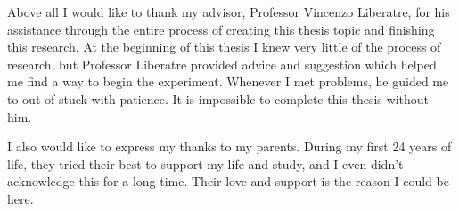 \begin{sloppypar}
Above all I would like to thank my advisor, Professor Vincenzo Liberatre, for his assistance through the entire process of
creating this thesis topic and finishing this research. At the beginning of this thesis I knew very little of the process of research, but Professor Liberatre provided advice and suggestion which helped me find a way to begin the experiment. Whenever I met problems, he guided me to out of stuck with patience. It is impossible to complete this thesis without him.

I also would like to express my thanks to my parents. During my first 24 years of life, they tried their best to support my life and study, and I even didn't acknowledge this for a long time. Their love and support is the reason I could be here. 


\end{sloppypar}